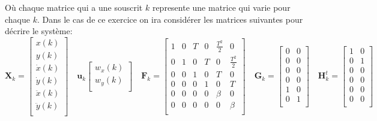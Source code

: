 \documentclass{article}
\begin{document}
Où chaque matrice qui a une souscrit $k$ represente une matrice qui varie pour chaque $k$. Dans le cas de ce exercice on ira considérer les matrices suivantes pour décrire le système:
\begin{equation}
    \mathbf{X}_{k} = 
    \begin{bmatrix}
        x(k)\\
        y(k)\\
        \dot{x}(k)\\
        \dot{y}(k)\\
        \ddot{x}(k)\\
        \ddot{y}(k)\\
    \end{bmatrix}
    \quad
    \mathbf{u}_{k}
    \begin{bmatrix}
        w_{x}(k)\\
        w_{y}(k)\\
    \end{bmatrix}
    \quad
    \mathbf{F}_{k} = 
    \begin{bmatrix}
        1 & 0 & T & 0 & \frac{T^2}{2}& 0\\
        0 & 1 & 0 & T & 0 & \frac{T^2}{2}\\
        0 & 0 & 1 & 0 & T & 0\\
        0 & 0 & 0 & 1 & 0 & T\\
        0 & 0 & 0 & 0 & \beta & 0\\
        0 & 0 & 0 & 0 & 0 & \beta\\
    \end{bmatrix}
    \quad
    \mathbf{G}_{k} = 
    \begin{bmatrix}
        0 & 0\\
        0 & 0\\
        0 & 0\\
        0 & 0\\
        1 & 0\\
        0 & 1\\
    \end{bmatrix}
    \quad
    \mathbf{H}_{k}^{t} = 
    \begin{bmatrix}
        1 & 0\\
        0 & 1\\
        0 & 0\\
        0 & 0\\
        0 & 0\\
        0 & 0\\
    \end{bmatrix}
\end{equation}
\end{document}
